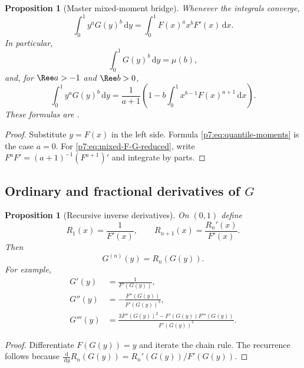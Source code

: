 \documentclass[11pt,oneside]{article}
\newtheorem{proposition}[theorem]{Proposition}
\theoremstyle{definition}
\theoremstyle{remark}
\newcommand{\dd}{\,\mathrm d}
\newcommand{\1}{\mathbf 1}
\begin{document}
\begin{proposition}[Master mixed-moment bridge]
\label{p7:prop:mixed-F-G}
Whenever the integrals converge,
\begin{equation}
 \int_0^1y^aG(y)^b\dd y
 =\int_0^1F(x)^a x^bF'(x)\dd x.
 \label{p7:eq:mixed-F-G}
\end{equation}
In particular,
\begin{equation}
 \int_0^1G(y)^b\dd y=\mu(b),
 \label{p7:eq:quantile-moments}
\end{equation}
and, for $\Ree a>-1$ and $\Ree b>0$,
\begin{equation}
 \int_0^1y^aG(y)^b\dd y
 =\frac1{a+1}\left(1-b\int_0^1x^{b-1}F(x)^{a+1}\dd x\right).
 \label{p7:eq:mixed-F-G-reduced}
\end{equation}
These formulas are \statusproved.
\end{proposition}

\begin{proof}
Substitute $y=F(x)$ in the left side.  Formula \cref{p7:eq:quantile-moments} is the case
$a=0$.  For \cref{p7:eq:mixed-F-G-reduced}, write
$F^aF'=(a+1)^{-1}(F^{a+1})'$ and integrate by parts.
\end{proof}

\subsection{Ordinary and fractional derivatives of $G$}

\begin{proposition}[Recursive inverse derivatives]
\label{p7:prop:inverse-derivatives}
On $(0,1)$ define
\begin{equation}
 R_1(x)=\frac1{F'(x)},
 \qquad
 R_{n+1}(x)=\frac{R_n'(x)}{F'(x)}.
 \label{p7:eq:Rn-recurrence}
\end{equation}
Then
\begin{equation}
 G^{(n)}(y)=R_n(G(y)).
 \label{p7:eq:inverse-n-derivative}
\end{equation}
For example,
\begin{align}
 G'(y)&=\frac1{F'(G(y))},\label{p7:eq:Gprime}\\
 G''(y)&=-\frac{F''(G(y))}{F'(G(y))^3},\label{p7:eq:Gsecond}\\
 G'''(y)&=
 \frac{3F''(G(y))^2-F'(G(y))F'''(G(y))}{F'(G(y))^5}.
 \label{p7:eq:Gthird}
\end{align}
\end{proposition}

\begin{proof}
Differentiate $F(G(y))=y$ and iterate the chain rule.  The recurrence follows because
$\frac{\dd}{\dd y}R_n(G(y))=R_n'(G(y))/F'(G(y))$.
\end{proof}
\end{document}
